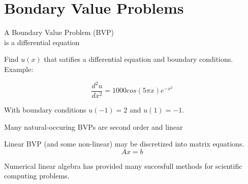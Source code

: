 \documentclass[xcolor={dvipsnames}]{beamer}
\begin{document}
\section{Bondary Value Problems}

\begin{frame}{A Boundary Value Problem (BVP) \\ is a differential equation}{}

Find $u(x)$ that satifies a differential equation and boundary conditions. Example:

\bigskip
\begin{equation*}
\frac{d^2u}{dx^2}=1000cos(5\pi x)e^{-x^2}
\end{equation*}

\bigskip
With boundary conditions $u(-1)=2$ and $u(1)=-1$.
\end{frame}


\begin{frame}{Many natural-occuring BVPs are second order and linear}{}

Linear BVP (and some non-linear) may be discretized into matrix equations.
\begin{equation*}
A x = b
\end{equation*}

\bigskip
Numerical linear algebra has provided many succesfull methods for scientific computing problems.

\end{frame}
\end{document}
